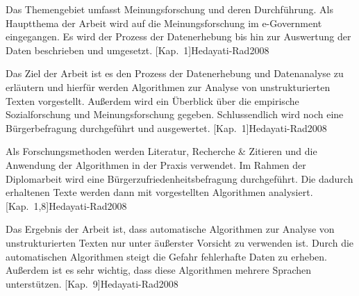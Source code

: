 

 Das Themengebiet umfasst Meinungsforschung und deren Durchführung. Als Hauptthema der Arbeit wird
auf die Meinungsforschung im e-Government eingegangen. Es wird der Prozess der Datenerhebung bis hin zur Auswertung
der Daten beschrieben und umgesetzt. [Kap.~1]{Hedayati-Rad2008}

 Das Ziel der Arbeit ist es den Prozess der Datenerhebung und Datenanalyse zu erläutern und
hierfür werden Algorithmen zur Analyse von unstrukturierten Texten vorgestellt. Außerdem wird ein Überblick über die
empirische Sozialforschung und Meinungsforschung gegeben. Schlussendlich wird noch eine Bürgerbefragung durchgeführt 
und ausgewertet. [Kap.~1]{Hedayati-Rad2008}

 Als Forschungsmethoden werden Literatur, Recherche & Zitieren und die Anwendung der
Algorithmen in der Praxis verwendet. Im Rahmen der Diplomarbeit wird eine Bürgerzufriedenheitsbefragung durchgeführt. 
Die dadurch erhaltenen Texte werden dann mit vorgestellten Algorithmen analysiert. [Kap.~1,8]{Hedayati-Rad2008}

 Das Ergebnis der Arbeit ist, dass automatische Algorithmen zur Analyse von unstrukturierten Texten 
nur unter äußerster Vorsicht zu verwenden ist. Durch die automatischen Algorithmen steigt die Gefahr fehlerhafte Daten
zu erheben. Außerdem ist es sehr wichtig, dass diese Algorithmen mehrere Sprachen unterstützen. [Kap.~9]{Hedayati-Rad2008}


%
\section*{\thesisheading} %









